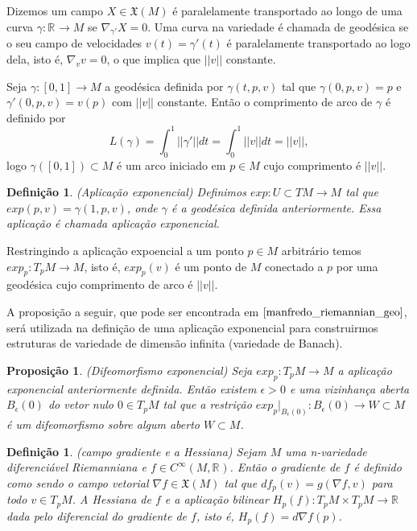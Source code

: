 \documentclass[12pt]{book}
\newtheorem{definicao}[teorema]{Definição}
\newtheorem{proposicao}[teorema]{Proposição}
\newcommand{\campossuaves}[1]{\mathfrak{X}(#1)}
\newcommand{\funcoessuaves}[1]{C^{\infty}(#1, \real{})}
\newcommand{\gradiente}{\nabla f}
\newcommand{\norma}[1]{||#1||}
\newcommand{\real}[1]{\mathbb{R}^{#1}}
\newcommand{\reta}{\real{}}
\begin{document}
	Dizemos um campo $X \in \campossuaves{M}$ é paralelamente transportado ao longo de uma curva $\gamma:\real{} \to M$ se $\nabla_{\gamma'}X=0$. Uma curva na variedade é chamada de geodésica se o seu campo de velocidades $v(t) = \gamma'(t)$ é paralelamente transportado ao logo dela, isto é, $\nabla_{v}v=0$, o que implica que $\norma{v}$ constante.
	
	Seja $\gamma:[0,1] \to M$ a geodésica definida por $\gamma(t,p,v)$ tal que $\gamma(0,p,v) = p$ e $\gamma'(0,p,v) = v(p)$ com $\norma{v}$ constante. Então o comprimento de arco de $\gamma$ é definido por 
	$$
	L(\gamma) =  \int_{0}^{1}\norma{\gamma'}dt = \int_{0}^{1}\norma{v}dt = \norma{v},
	$$
	logo $\gamma([0,1]) \subset M$ é um arco iniciado em $p \in M$ cujo comprimento é $\norma{v}$.
	\begin{definicao}\label{definicao_aplicacao_exponencial}
		(Aplicação exponencial) Definimos $exp:U \subset TM \to M$ tal que $exp(p,v) = \gamma(1, p, v)$, onde $\gamma$ é a geodésica definida anteriormente. Essa aplicação é chamada aplicação exponencial.
	\end{definicao}
	
	Restringindo a aplicação expoencial a um ponto $p \in M$ arbitrário temos $exp_{p}:T_{p}M \to M$, isto é, $exp_{p}(v)$ é um ponto de $M$ conectado a $p$ por uma geodésica cujo comprimento de arco é $\norma{v}$. 
	
	A proposição a seguir, que pode ser encontrada em $\cite{manfredo_riemannian_geo}$, será utilizada na definição de uma aplicação exponencial para construirmos estruturas de variedade de dimensão infinita (variedade de Banach).
	
	\begin{proposicao}\label{proposicao_difeomorfismo_exponencial}
		(Difeomorfismo exponencial) Seja  $exp_{p}:T_{p}M \to M$ a aplicação exponencial anteriormente definida. Então existem $\epsilon>0$ e uma vizinhança aberta $B_{\epsilon}(0)$ do vetor nulo $0 \in T_{p}M$ tal que a restrição $exp_{p}|_{B_{\epsilon}(0)}:B_{\epsilon}(0) \to W \subset M$ é um difeomorfismo sobre algum aberto $W \subset M$.
	\end{proposicao}
	
	\begin{definicao}\label{definicao_gradiente_hessiana}
		(campo gradiente e a Hessiana) Sejam $M$ uma n-variedade diferenciável Riemanniana e $f\in \funcoessuaves{M}$. Então o gradiente de $f$ é definido como sendo o campo vetorial $\gradiente \in \campossuaves{M}$ tal que $df_{p}(v) = g(\gradiente, v)$ para todo $v \in T_{p}M$. A Hessiana de $f$ e a aplicação bilinear $H_{p}(f): T_{p}M\times T_{p}M \to \reta$ dada pelo diferencial do gradiente de $f$, isto é, $H_{p}(f) = d\gradiente(p)$.
	\end{definicao}
	
\end{document}
